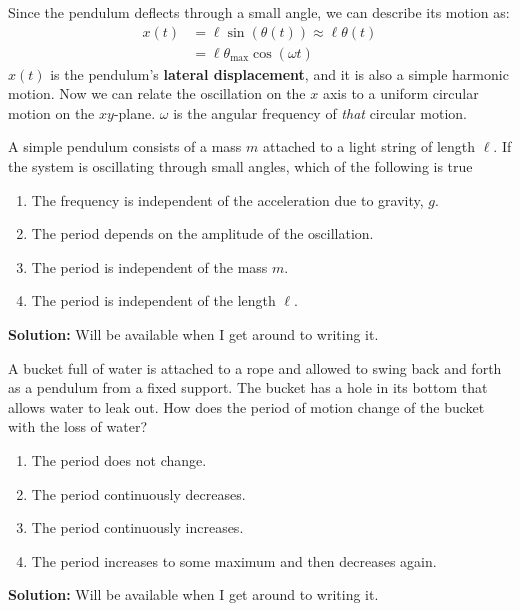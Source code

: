 Since the pendulum deflects through a small angle, we can describe its motion
as:
\begin{align*}
  x(t) &=\ell\sin\left(\theta(t)\right)\approx\ell\theta(t)\\
  &=\ell\theta_\text{max}\cos(\omega t)
\end{align*}
$x(t)$ is the pendulum's \textbf{lateral displacement}, and it is also a simple
harmonic motion. Now we can relate the oscillation on the $x$ axis to a uniform
circular motion on the $xy$-plane. $\omega$ is the angular frequency
of \emph{that} circular motion.   

\begin{example}
  A simple pendulum consists of a mass $m$ attached to a light string of length
  $\ell$. If the system is oscillating through small angles, which of the
  following is true
  \begin{enumerate}[nosep]
  \item The frequency is independent of the acceleration due to gravity, $g$.
  \item The period depends on the amplitude of the oscillation.
  \item The period is independent of the mass $m$.
  \item The period is independent of the length $\ell$.
  \end{enumerate}

  \textbf{Solution:} Will be available when I get around to writing it.
\end{example}

\begin{example}
  A bucket full of water is attached to a rope and allowed to swing back and
  forth as a pendulum from a fixed support. The bucket has a hole in its
  bottom that allows water to leak out. How does the period of motion change of
  the bucket with the loss of water?
  \begin{enumerate}[nosep]
  \item The period does not change.
  \item The period continuously decreases.
  \item The period continuously increases.
  \item The period increases to some maximum and then decreases again.
  \end{enumerate}

  \textbf{Solution:} Will be available when I get around to writing it.
\end{example}

